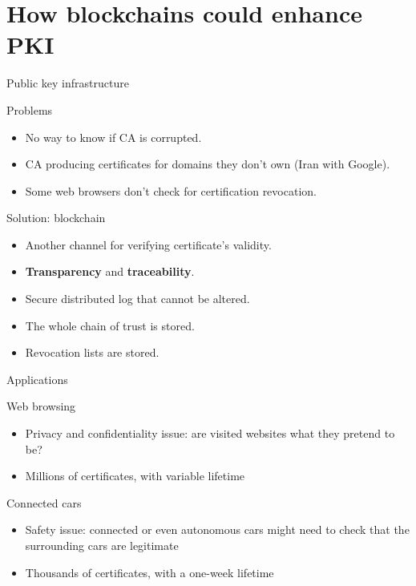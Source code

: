 \section[Blockchains for PKI]{How blockchains could enhance PKI}

\begin{frame}{Public key infrastructure}
	\begin{alertblock}{Problems}
		\begin{itemize}
			\item No way to know if CA is corrupted.
			\item CA producing certificates for domains they don't own (Iran with Google).
			\item Some web browsers don't check for certification revocation.
		\end{itemize}
	\end{alertblock}

	\begin{exampleblock}{Solution: blockchain}
		\begin{itemize}
			\item Another channel for
			verifying certificate's validity.
			\item \textbf{Transparency} and \textbf{traceability}.
			\item Secure distributed log that cannot be altered.
			\item The whole chain of trust is stored.
			\item Revocation lists are stored.
		\end{itemize}
	\end{exampleblock}
\end{frame}

\begin{frame}{Applications}

	\begin{exampleblock}{Web browsing}
		\begin{itemize}
			\item Privacy and confidentiality issue: are visited websites what they pretend to be?
			\item Millions of certificates, with variable lifetime
		\end{itemize}
	\end{exampleblock}
	
	\begin{alertblock}{Connected cars}
		\begin{itemize}
			\item Safety issue: connected or even autonomous cars might need to check that the surrounding cars are legitimate
			\item Thousands of certificates, with a one-week lifetime
		\end{itemize}
	\end{alertblock}


\end{frame}
